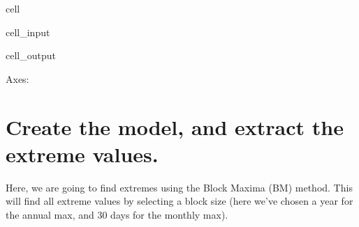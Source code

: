 \documentclass[letterpaper,10pt,english]{jupyterBook}
\begin{document}
\begin{sphinxuseclass}{cell}
\begin{sphinxVerbatimInput}
\begin{sphinxuseclass}{cell_input}
\begin{sphinxVerbatim}[commandchars=\\\{\}]
  
  

    

 
\end{sphinxVerbatim}

\end{sphinxuseclass}\end{sphinxVerbatimInput}
\begin{sphinxVerbatimOutput}

\begin{sphinxuseclass}{cell_output}
\begin{sphinxVerbatim}[commandchars=\\\{\}]
\PYGZlt{}Axes: \PYGZgt{}
\end{sphinxVerbatim}

\noindent{}

\end{sphinxuseclass}\end{sphinxVerbatimOutput}

\end{sphinxuseclass}

\part{Create the model, and extract the extreme values.}
\label{\detokenize{notebooks/regional_and_local/SL_Extremes_annual:create-the-model-and-extract-the-extreme-values}}
\sphinxAtStartPar
Here, we are going to find extremes using the Block Maxima (BM) method. This will find all extreme values by selecting a block size (here we’ve chosen a year for the annual max, and 30 days for the monthly max).
\end{document}
